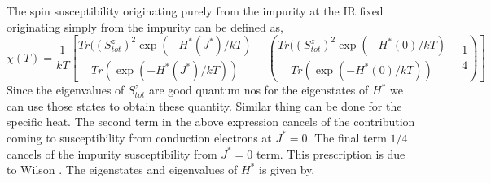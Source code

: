 \documentclass[aps,prx,preprint,groupedaddress]{revtex4-2}
\begin{document}
The spin susceptibility originating purely from the impurity at the IR fixed originating simply from the impurity can be defined as,
\begin{equation}
\chi(T)=\frac{1}{kT}\left[\frac{Tr((S^{z}_{tot})^{2}\exp(-H^{*}(J^{*})/kT)}{Tr(\exp(-H^{*}(J^{*})/kT))}-\left(\frac{Tr((S^{z}_{tot})^{2}\exp(-H^{*}(0)/kT)}{Tr(\exp(-H^{*}(0)/kT))}-\frac{1}{4}\right)\right]
\end{equation}
Since the eigenvalues of $S^{z}_{tot}$ are good quantum nos for the eigenstates of $H^{*}$ we can use those states to obtain these quantity. Similar thing can be done for the specific heat. The second term in the above expression cancels of the contribution coming to susceptibility from conduction electrons at $J^{*}=0$. The final term $1/4$ cancels of the impurity susceptibility from $J^{*}=0$ term. This prescription is due to Wilson \cite{wilson1975renormalization}. The eigenstates and eigenvalues of $H^{*}$ is given by,
\end{document}
